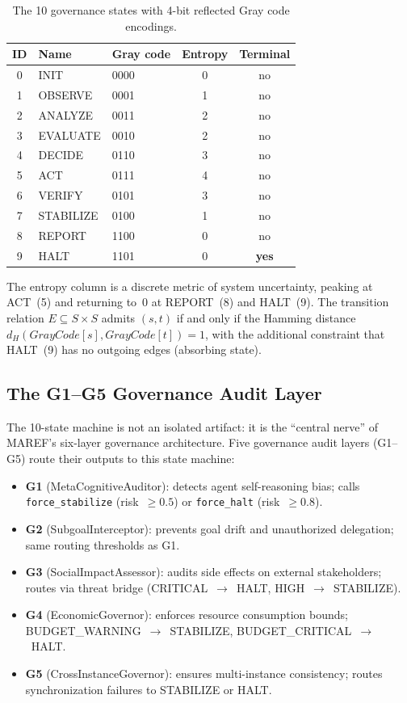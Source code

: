 \documentclass[11pt]{article}
\begin{document}
\begin{table}[h]
\centering
\begin{tabular}{cllcc}
\toprule
ID & Name & Gray code & Entropy & Terminal \\
\midrule
0 & INIT & 0000 & 0 & no \\
1 & OBSERVE & 0001 & 1 & no \\
2 & ANALYZE & 0011 & 2 & no \\
3 & EVALUATE & 0010 & 2 & no \\
4 & DECIDE & 0110 & 3 & no \\
5 & ACT & 0111 & 4 & no \\
6 & VERIFY & 0101 & 3 & no \\
7 & STABILIZE & 0100 & 1 & no \\
8 & REPORT & 1100 & 0 & no \\
9 & HALT & 1101 & 0 & \textbf{yes} \\
\bottomrule
\end{tabular}
\caption{The 10 governance states with 4-bit reflected Gray code encodings.}
\end{table}

The entropy column is a discrete metric of system uncertainty, peaking at
ACT~(5) and returning to~0 at REPORT~(8) and HALT~(9). The transition relation
$E \subseteq S \times S$ admits $(s,t)$ if and only if the Hamming distance
$d_H(\mathit{GrayCode}[s], \mathit{GrayCode}[t]) = 1$, with the additional
constraint that HALT~(9) has no outgoing edges (absorbing state).

\subsection{The G1--G5 Governance Audit Layer}

The 10-state machine is not an isolated artifact: it is the ``central nerve''
of MAREF's six-layer governance architecture. Five governance audit layers
(G1--G5) route their outputs to this state machine:

\begin{itemize}
  \item \textbf{G1} (MetaCognitiveAuditor): detects agent self-reasoning bias;
    calls \texttt{force\_stabilize} (risk~$\geq 0.5$) or \texttt{force\_halt}
    (risk~$\geq 0.8$).
  \item \textbf{G2} (SubgoalInterceptor): prevents goal drift and unauthorized
    delegation; same routing thresholds as G1.
  \item \textbf{G3} (SocialImpactAssessor): audits side effects on external
    stakeholders; routes via threat bridge (CRITICAL~$\to$~HALT,
    HIGH~$\to$~STABILIZE).
  \item \textbf{G4} (EconomicGovernor): enforces resource consumption bounds;
    BUDGET\_WARNING~$\to$~STABILIZE, BUDGET\_CRITICAL~$\to$~HALT.
  \item \textbf{G5} (CrossInstanceGovernor): ensures multi-instance consistency;
    routes synchronization failures to STABILIZE or HALT.
\end{itemize}
\end{document}
